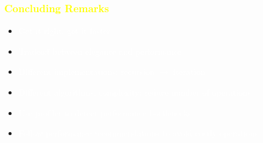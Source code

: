\documentclass[xcolor=table,10pt,final]{beamer}
\begin{document}
{
\begin{frame}
	\frametitle{\textcolor{yellow}{Concluding Remarks}}
	\begin{itemize}
		\item \textcolor{white}{Get it right, get it faster}
		\item \textcolor{white}{Tradeoff between elegance and performance}
		\item \textcolor{white}{Different implementations: recursion $\rightarrow$ iteration}
		\item \textcolor{white}{Different algorithms, complexity: reduce number of operations}
		\item \textcolor{white}{Use profiler to detect performance bottlenecks}
		\item \textcolor{white}{Follow performance recommendations to avoid costly operations}
	\end{itemize}
\end{frame}
}

\end{document}
